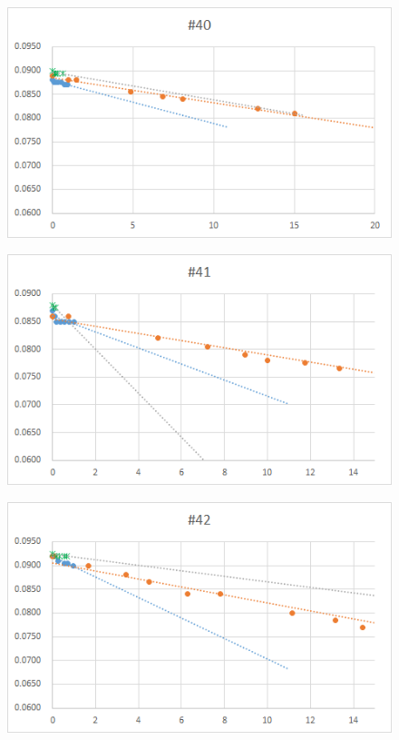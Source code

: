 \documentclass[12pt,a4paper]{jarticle}
\begin{document}
\begin{figure}[htbp]
  \centering
     \includegraphics[width=120mm]{vol_040.png}
\end{figure}
\begin{figure}[htbp]
  \centering
     \includegraphics[width=120mm]{vol_041.png}
\end{figure}
\begin{figure}[htbp]
  \centering
     \includegraphics[width=120mm]{vol_042.png}
\end{figure}
\end{document}

